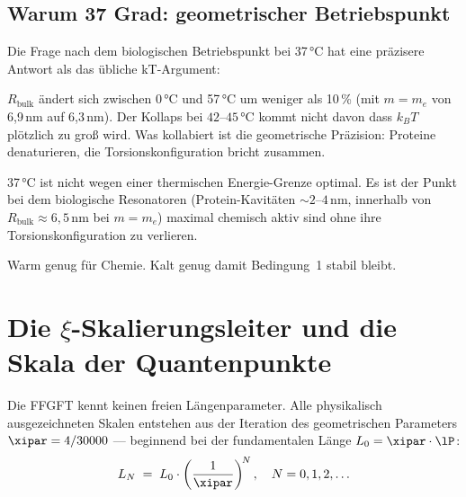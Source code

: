 \subsection{Warum 37 Grad: geometrischer Betriebspunkt}

Die Frage nach dem biologischen Betriebspunkt bei 37\,°C
hat eine präzisere Antwort als das übliche kT-Argument:

$R_{\text{bulk}}$ ändert sich zwischen 0\,°C und 57\,°C
um weniger als 10\,\% (mit $m = m_e$ von 6{,}9\,nm auf 6{,}3\,nm).
Der Kollaps bei $42$--$45\,°\text{C}$ kommt nicht davon
dass $k_BT$ plötzlich zu groß wird. Was kollabiert ist
die geometrische Präzision: Proteine denaturieren,
die Torsionskonfiguration bricht zusammen.

\begin{foundation}
37\,°C ist nicht wegen einer thermischen Energie-Grenze optimal.
Es ist der Punkt bei dem biologische Resonatoren
(Protein-Kavitäten $\sim 2$--$4$\,nm, innerhalb von
$R_{\text{bulk}} \approx 6{,}5$\,nm bei $m = m_e$) maximal
chemisch aktiv sind ohne ihre Torsionskonfiguration zu verlieren.

Warm genug für Chemie.
Kalt genug damit Bedingung~1 stabil bleibt.
\end{foundation}

\section{Die \texorpdfstring{$\xi$}{xi}-Skalierungsleiter und
  die Skala der Quantenpunkte}
\label{sec:xi-leiter}

Die FFGFT kennt keinen freien Längenparameter.
Alle physikalisch ausgezeichneten Skalen entstehen aus der
Iteration des geometrischen Parameters $\xipar = 4/30000$
--- beginnend bei der fundamentalen Länge
$L_0 = \xipar \cdot \lP$:
\begin{equation}
  L_N \;=\; L_0 \cdot \left(\frac{1}{\xipar}\right)^{\!N},
  \quad N = 0, 1, 2, \ldots
\end{equation}

